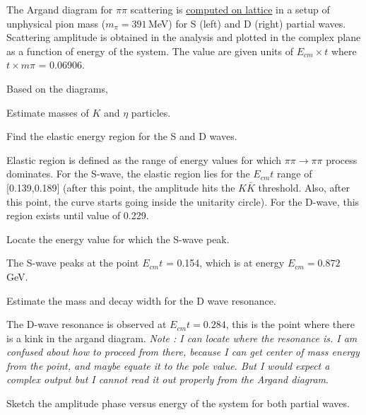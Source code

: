 
The Argand diagram for $\pi\pi$ scattering is \href{https://inspirehep.net/literature/1618009}{computed on lattice}
in a setup of unphysical pion mass ($m_\pi=391\,$MeV) for S (left) and D (right) partial waves.
Scattering amplitude is obtained in the analysis and plotted in the complex plane as a function of energy of the system.
The value are given units of $E_{cm} \times t$ where $t \times m\pi$ = 0.06906.


Based on the diagrams,
\be
\item Estimate masses of $K$ and $\eta$ particles.\\
\item Find the elastic energy region for the S and D waves.\\
\begin{solution}
	Elastic region is defined as the range of energy values for which $\pi\pi \rightarrow \pi\pi$ process dominates. For the S-wave, the elastic region lies for the $E_{cm}t$ range of [0.139,0.189] (after this point, the amplitude hits the $K\bar{K}$ threshold. Also, after this point, the curve starts going inside the unitarity circle). For the D-wave, this region exists until value of 0.229.
\end{solution}
\item Locate the energy value for which the S-wave peak. \\
\begin{solution}
	The S-wave peaks at the point $E_{cm}t$ = 0.154, which is at energy $E_{cm} = 0.872$ GeV.
\end{solution}
\item Estimate the mass and decay width for the D wave resonance.\\
\begin{solution}
	The D-wave resonance is observed at $E_{cm}t = 0.284$, this is the point where there is a kink in the argand diagram. \textit{Note : I can locate where the resonance is. I am confused about how to proceed from there, because I can get center of mass energy from the point, and maybe equate it to the pole value. But I would expect a complex output but I cannot read it out properly from the Argand diagram}.
\end{solution}
\item Sketch the amplitude phase versus energy of the system for both partial waves.\\
\ee